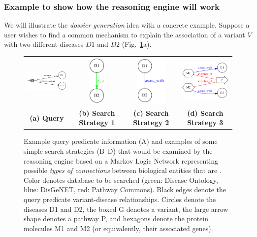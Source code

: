 \documentclass[11pt,notitlepage]{article}
\begin{document}
\subsubsection{Example to show how the reasoning engine will work}
We will illustrate the {\em dossier generation\/} idea with a concrete example. Suppose a user wishes to find a common mechanism to explain the association of a variant $V$ with two different diseases $D1$ and $D2$ (Fig.~\ref{fig:networks}a).
\begin{figure}[h!]
  \begin{tabular}{cccc}
    \includegraphics[width=1.4in]{baseproblem.png} &
    \includegraphics[width=0.35in]{net1.png} &
    \includegraphics[width=0.6in]{net2.png} &
    \includegraphics[width=1.5in]{net3.png}\\
    {\bf (a) Query} & {\bf (b) Search Strategy 1} & {\bf (c) Search Strategy 2} & {\bf (d) Search Strategy 3}
  \end{tabular}
  \caption{Example query predicate information (A) and examples of some simple
    search strategies (B--D) that would be examined by the reasoning engine based on a Markov Logic Network representing possible {\em types of connections\/}  between biological
    entities that are  . Color denotes database to be searched (green: Disease Ontology, blue: DisGeNET, red: Pathway Commons). Black edges denote the query predicate variant-disease relationships. Circles denote the diseases D1 and D2, the boxed G denotes a variant, the large arrow shape denotes a pathway P, and hexagons denote the protein molecules M1 and M2 (or equivalently, their associated genes).}
  \label{fig:networks}
\end{figure}
\end{document}
